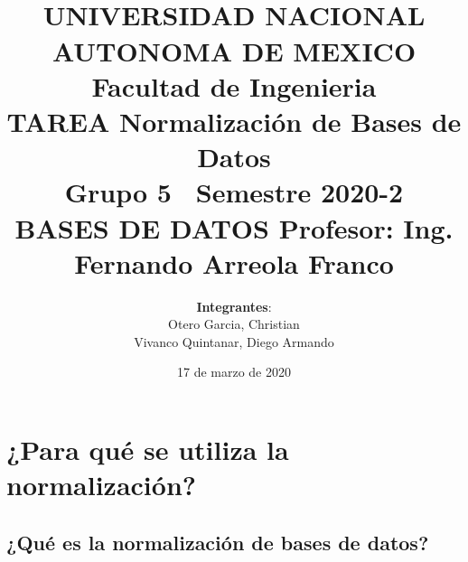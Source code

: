\documentclass[spanish]{article}
\begin{document}
\title{
\\
UNIVERSIDAD NACIONAL AUTONOMA DE MEXICO\\
\vfill
Facultad de Ingenieria\\
\vfill
{\bfseries TAREA}
\vfill
{\bfseries Normalización de Bases de Datos }
\vfill
\\Grupo 5\
\vfill
Semestre 2020-2\\
\vfill
BASES DE DATOS
\vfill
Profesor: Ing. Fernando Arreola Franco}
\vfill
\author{\textbf{Integrantes}:\\
Otero Garcia, Christian\\
Vivanco Quintanar, Diego Armando\\}
\date{17 de marzo de 2020}
\maketitle
\newpage


\section{¿Para qué se utiliza la normalización?}

\subsection{¿Qué es la normalización de bases de datos?}\\
\end{document}
